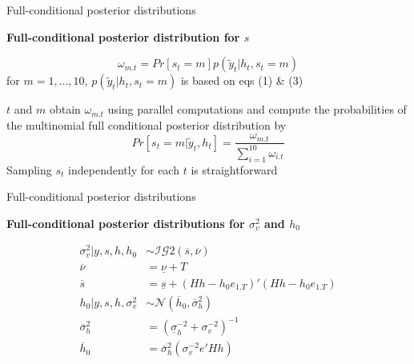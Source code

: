 \documentclass[notes,blackandwhite,mathsans,usenames,dvipsnames]{beamer}
\begin{document}
\begin{frame}{Full-conditional posterior distributions}

\textbf{Full-conditional posterior distribution for $s$}

\begin{equation*}
\omega_{m.t} = Pr[s_t=m]p\left(\tilde{y}_t|h_t, s_t=m\right)
\end{equation*}
{\color{mcxs2}for} $m=1,\dots,10$, $p\left(\tilde{y}_t|h_t, s_t=m\right)$ {\color{mcxs2}is based on eqs} (1) \& (3)

 $t$ {\color{mcxs2}and} $m$ {\color{mcxs2}obtain} $\omega_{m.t}$ {\color{mcxs2}using parallel computations and compute the probabilities of the multinomial full conditional posterior distribution by }
\begin{equation*}
Pr[s_t=m|\tilde{y}_t, h_t] = \frac{\omega_{m.t}}{\sum_{i=1}^{10}\omega_{i.t}}
\end{equation*}
{\color{mcxs2}Sampling} $s_t$ {\color{mcxs2}independently for each} $t$ {\color{mcxs2}is straightforward}

\end{frame}






\begin{frame}{Full-conditional posterior distributions}

\textbf{Full-conditional posterior distributions for $\sigma_v^2$ and $h_0$}

\begin{align*}
\sigma_v^2| y,s,h,h_0 &\sim\mathcal{IG}2\left(\overline{s},\overline{\nu}  \right)\\
\overline{\nu} &= \underline{\nu} + T \\
\overline{s} &= \underline{s} + (Hh - h_0 e_{1.T})'(Hh - h_0 e_{1.T}) \\[2ex]
h_0| y,s,h,\sigma_v^2 &\sim\mathcal{N}\left(\overline{h}_0,\overline{\sigma}_h^2  \right)\\
\overline{\sigma}_h^2 &= \left( \underline{\sigma}_h^{-2} + \sigma_v^{-2} \right)^{-1} \\
\overline{h}_0 &= \overline{\sigma}_h^2\left( \sigma_v^{-2} e'Hh \right)
\end{align*}

\end{frame}
\end{document}
